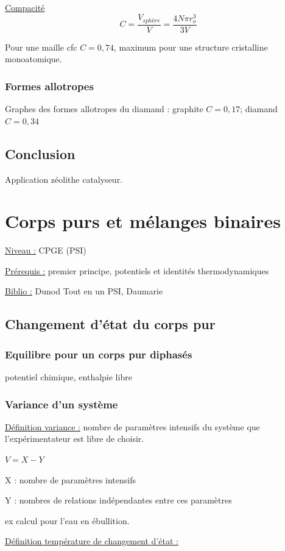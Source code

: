 \documentclass{article}%
\begin{document}
\underline{Compacité} \[C=\frac{V_{sphère}}{V}=\frac{4N\pi r_o^3}{3V}\]

Pour une maille cfc $C=0,74$, maximum pour une structure cristalline monoatomique.

\subsubsection{Formes allotropes}

Graphes des formes allotropes du diamand : graphite $C=0,17$; diamand $C=0,34$

\subsection{Conclusion}

Application zéolithe catalyseur.

\section{Corps purs et mélanges binaires}

\underline{Niveau :} CPGE (PSI)

\underline{Prérequis :} premier principe, potentiels et identités thermodynamiques

\underline{Biblio :} Dunod Tout en un PSI, Daumarie

\subsection{Changement d'état du corps pur}
\subsubsection{Equilibre pour un corps pur diphasés}
potentiel chimique, enthalpie libre
\subsubsection{Variance d'un système}
\underline{Définition variance :} nombre de paramètres intensifs du système que l'expérimentateur est libre de choisir.

$V=X-Y$

X : nombre de paramètres intensifs

Y : nombres de relations indépendantes entre ces paramètres

ex calcul pour l'eau en ébullition.

\underline{Définition température de changement d'état :} 
\end{document}
